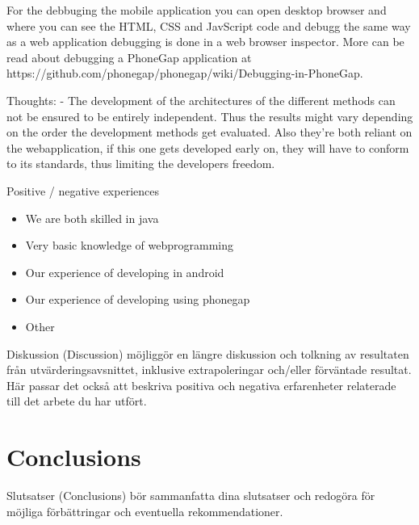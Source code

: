 \documentclass{cslthse-msc}
\begin{document}
For the debbuging the mobile application you can open desktop browser and where you can see the HTML, CSS and JavScript code and debugg the same way as a web application debugging is done in a web browser inspector. More can be read about debugging a PhoneGap application at https://github.com/phonegap/phonegap/wiki/Debugging-in-PhoneGap.  



Thoughts:
 - The development of the architectures of the different methods can not be ensured to be entirely independent. Thus the results might vary depending on the order the development methods get evaluated. Also they're both reliant on the webapplication, if this one gets developed early on, they will have to conform to its standards, thus limiting the developers freedom. 

Positive / negative experiences
\begin{itemize}
    \item We are both skilled in java
    \item Very basic knowledge of webprogramming
    \item Our experience of developing in android
    \item Our experience of developing using phonegap
    \item Other
\end{itemize}

Diskussion (Discussion) möjliggör en längre diskussion och tolkning av resultaten från utvärderingsavsnittet, inklusive extrapoleringar och/eller förväntade resultat. Här passar det också att beskriva positiva och negativa erfarenheter relaterade till det arbete du har utfört.

\chapter{Conclusions}
Slutsatser (Conclusions) bör sammanfatta dina slutsatser och redogöra för möjliga förbättringar och eventuella rekommendationer.
\end{document}
